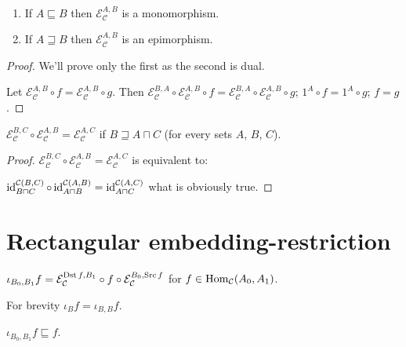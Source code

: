 \begin{prop}\label{e-mono-epi}
  ~  
  \begin{enumerate}
    \item If $A \sqsubseteq B$ then $\mathcal{E}_{\mathcal{C}}^{A,B}$ is a
    monomorphism.
    
    \item If $A \sqsupseteq B$ then $\mathcal{E}_{\mathcal{C}}^{A,B}$ is an
    epimorphism.
  \end{enumerate}
\end{prop}

\begin{proof}
  We'll prove only the first as the second is dual.
  
  Let $\mathcal{E}_{\mathcal{C}}^{A,B} \circ f = \mathcal{E}_{\mathcal{C}}^{A,B} \circ g$. Then
  $\mathcal{E}_{\mathcal{C}}^{B,A} \circ \mathcal{E}_{\mathcal{C}}^{A,B}
  \circ f = \mathcal{E}_{\mathcal{C}}^{B,A} \circ \mathcal{E}_{\mathcal{C}}^{A,B} \circ g$;
  $1^A \circ f = 1^A \circ g$; $f = g$.
\end{proof}

\begin{prop}
  $\mathcal{E}_{\mathcal{C}}^{B,C} \circ \mathcal{E}_{\mathcal{C}}^{A,B} = \mathcal{E}_{\mathcal{C}}^{A,C}$
  if $B \sqsupseteq A \sqcap C$ (for every sets $A$, $B$, $C$).
\end{prop}

\begin{proof}
  $\mathcal{E}_{\mathcal{C}}^{B,C} \circ \mathcal{E}_{\mathcal{C}}^{A,B} = \mathcal{E}_{\mathcal{C}}^{A,C}$
  is equivalent to:
  
  $\operatorname{id}^{\mathcal{C}(B,C)}_{B \sqcap C} \circ \operatorname{id}^{\mathcal{C}(A,B)}_{A \sqcap B} = \operatorname{id}^{\mathcal{C}(A,C)}_{A \sqcap C}$ what is obviously true.
\end{proof}

\section{Rectangular embedding-restriction}

\begin{defn}
  $\iota_{B_0, B_1} f = \mathcal{E}_{\mathcal{C}}^{\operatorname{Dst} f,B_1} \circ f \circ
  \mathcal{E}_{\mathcal{C}}^{B_0,\operatorname{Src} f}$ for $f \in
  \operatorname{Hom}_{\mathcal{C}} (A_0 , A_1)$.
\end{defn}

For brevity $\iota_B f = \iota_{B, B} f$.

\begin{obvious}
$\iota_{B_0, B_1} f\sqsubseteq f$.
\end{obvious}

